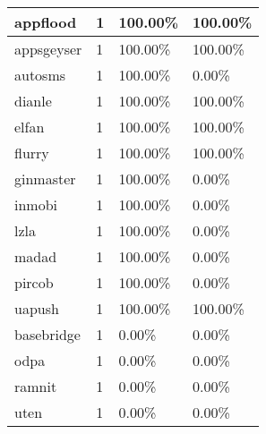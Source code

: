 \begin{table}[]
\begin{tabular}{|l|l|l|l|}
appflood                & 1                & 100.00\%              & 100.00\%                   \\ \hline
appsgeyser              & 1                & 100.00\%              & 100.00\%                   \\ \hline
autosms                 & 1                & 100.00\%              & 0.00\%                     \\ \hline
dianle                  & 1                & 100.00\%              & 100.00\%                   \\ \hline
elfan                   & 1                & 100.00\%              & 100.00\%                   \\ \hline
flurry                  & 1                & 100.00\%              & 100.00\%                   \\ \hline
ginmaster               & 1                & 100.00\%              & 0.00\%                     \\ \hline
inmobi                  & 1                & 100.00\%              & 0.00\%                     \\ \hline
lzla                    & 1                & 100.00\%              & 0.00\%                     \\ \hline
madad                   & 1                & 100.00\%              & 0.00\%                     \\ \hline
pircob                  & 1                & 100.00\%              & 0.00\%                     \\ \hline
uapush                  & 1                & 100.00\%              & 100.00\%                   \\ \hline
basebridge              & 1                & 0.00\%                & 0.00\%                     \\ \hline
odpa                    & 1                & 0.00\%                & 0.00\%                     \\ \hline
ramnit                  & 1                & 0.00\%                & 0.00\%                     \\ \hline
uten                    & 1                & 0.00\%                & 0.00\%                     \\ \hline
\end{tabular}
\end{table}